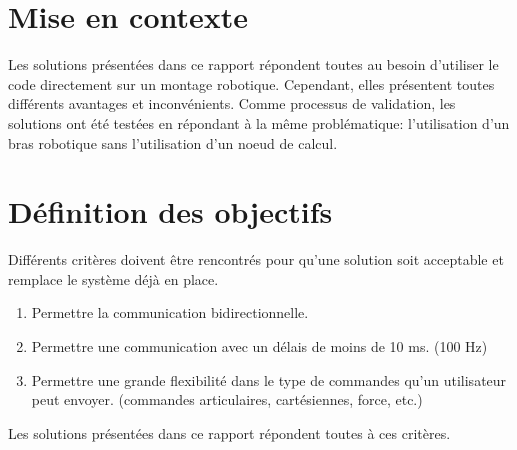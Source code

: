 \documentclass[root.tex]{subfiles}
\begin{document}
\section{Mise en contexte}

Les solutions présentées dans ce rapport répondent toutes au besoin d'utiliser le code directement sur un montage robotique. 
Cependant, elles présentent toutes différents avantages et inconvénients. 
Comme processus de validation, les solutions ont été testées en répondant à la même problématique: l'utilisation d'un bras robotique sans l'utilisation d'un noeud de calcul.


\section{Définition des objectifs}

Différents critères doivent être rencontrés pour qu'une solution soit acceptable et remplace le système déjà en place.

\begin{enumerate}
\item Permettre la communication bidirectionnelle.
\item Permettre une communication avec un délais de moins de 10 ms. (100 Hz)
\item Permettre une grande flexibilité dans le type de commandes qu'un utilisateur peut envoyer. (commandes articulaires, cartésiennes, force, etc.)
\end{enumerate}
Les solutions présentées dans ce rapport répondent toutes à ces critères.


\newpage
\end{document}
